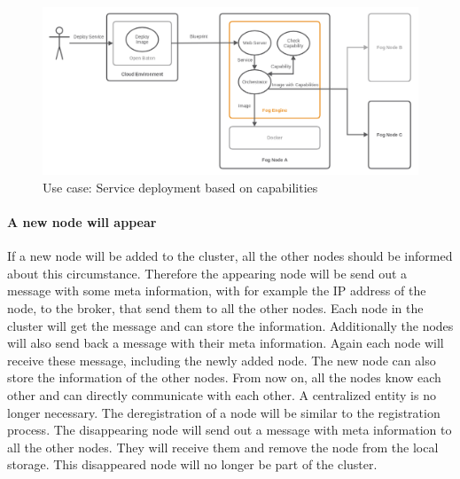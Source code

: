 \begin{figure}[H]
    \centering
    \includegraphics[width=\textwidth]{resources/images/use_case_deploy_service_multiple_nodes.png}
    \caption[Use case: Service deployment based on capabilities]{Use case: Service deployment based on capabilities}
    \label{fig:use_case_deploy_service_multiple_nodes}
\end{figure}

\paragraph{A new node will appear}
If a new node will be added to the cluster, all the other nodes should be informed about this circumstance.
Therefore the appearing node will be send out a message with some meta information, with for example the \ac{IP} address of the node, to the broker, that send them to all the other nodes.
Each node in the cluster will get the message and can store the information.
Additionally the nodes will also send back a message with their meta information.
Again each node will receive these message, including the newly added node.
The new node can also store the information of the other nodes.
From now on, all the nodes know each other and can directly communicate with each other.
A centralized entity is no longer necessary.
The deregistration of a node will be similar to the registration process.
The disappearing node will send out a message with meta information to all the other nodes.
They will receive them and remove the node from the local storage.
This disappeared node will no longer be part of the cluster.

